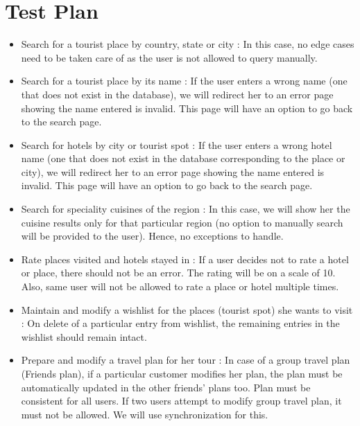 \documentclass[11pt]{article}
\begin{document}
\section{Test Plan}
\begin{itemize}
\item Search for a tourist place by country, state or city :
\newline
In this case, no edge cases need to be taken care of as the user is not allowed to query manually.

\item Search for a tourist place by its name :
\newline
If the user enters a wrong name (one that does not exist in the database),  we will redirect her to an error page showing the name entered is invalid. This page will have an option to go back to the search page.

\item Search for hotels by city or tourist spot :
\newline
If the user enters a wrong hotel name (one that does not exist in the database corresponding to the place or city),  we will redirect her to an error page showing the name entered is invalid. This page will have an option to go back to the search page.

\item Search for speciality cuisines of the region :
\newline
In this case, we will show her the cuisine results only for that particular region (no option to manually search will be provided to the user). Hence, no exceptions to handle.

\item Rate places visited and hotels stayed in :
\newline
If a user decides not to rate a hotel or place, there should not be an error. The rating will be on a scale of 10. Also, same user will not be allowed to rate a place or hotel multiple times. 

\item Maintain and modify a wishlist for the places (tourist spot) she wants to visit :
\newline
On delete of a particular entry from wishlist, the remaining entries in the wishlist should remain intact.

\item Prepare and modify a travel plan for her tour :
\newline
In case of a group travel plan (Friends plan), if a particular customer modifies her plan, the plan must be automatically updated in the other friends' plans too. Plan must be consistent for all users. 
\newline
If two users attempt to modify group travel plan, it must not be allowed. We will use synchronization for this.


\end{itemize}
\end{document}
